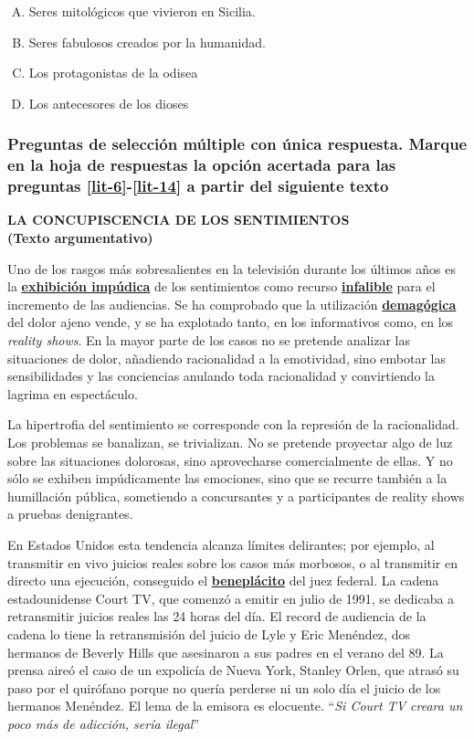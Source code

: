 \begin{enumerate}
\begin{enumerate}[(A)]
\item Seres mitológicos que vivieron en Sicilia.
\item Seres fabulosos creados por la humanidad. 
\item Los protagonistas de la odisea
\item Los antecesores de los dioses
\end{enumerate}



\subsubsection*{Preguntas de selección múltiple con única respuesta.  Marque en la hoja de respuestas la opción acertada para las preguntas \ref{lit-6}-\ref{lit-14} a partir del siguiente texto}

\begin{center}
\textbf{LA CONCUPISCENCIA DE LOS SENTIMIENTOS\\
(Texto argumentativo)}
\end{center}


Uno de los rasgos más sobresalientes en la televisión durante los últimos años es la \textbf{\underline{exhibición impúdica}} de los sentimientos como recurso \textbf{\underline{infalible}} para el incremento de las audiencias. Se ha comprobado que la utilización \textbf{\underline{demagógica }} del dolor ajeno vende, y se ha explotado tanto, en los informativos como, en los \textit{reality shows}. En la mayor parte de los casos no se pretende analizar las situaciones de dolor, añadiendo racionalidad a la emotividad, sino embotar las sensibilidades y las conciencias anulando toda racionalidad y convirtiendo la lagrima en espectáculo.

La hipertrofia del sentimiento se corresponde con la represión de la racionalidad.  Los problemas se banalizan, se trivializan. No se pretende proyectar algo de luz sobre las situaciones dolorosas, sino aprovecharse comercialmente de ellas. Y no sólo se exhiben impúdicamente las emociones, sino que se recurre también a la humillación pública, sometiendo a concursantes y a participantes de reality shows a pruebas denigrantes.

En Estados Unidos esta tendencia alcanza límites delirantes; por ejemplo, al transmitir en vivo juicios reales sobre los casos más morbosos, o al transmitir en directo una ejecución, conseguido el \textbf{\underline{beneplácito}} del juez federal. La cadena estadounidense Court TV, que comenzó a emitir en julio de 1991, se dedicaba a retransmitir juicios reales las 24 horas del día.  El record de audiencia de la cadena lo tiene la retransmisión del juicio de Lyle y Eric Menéndez, dos hermanos de Beverly Hills que asesinaron a sus padres en el verano del 89. La prensa aireó el caso de un expolicía de Nueva York, Stanley Orlen, que atrasó su paso por el quirófano porque no quería perderse ni un solo día el juicio de los hermanos Menéndez. El lema de la emisora es elocuente. ``\textit{Si Court TV creara un poco más de adicción, sería ilegal}''


\end{enumerate}
